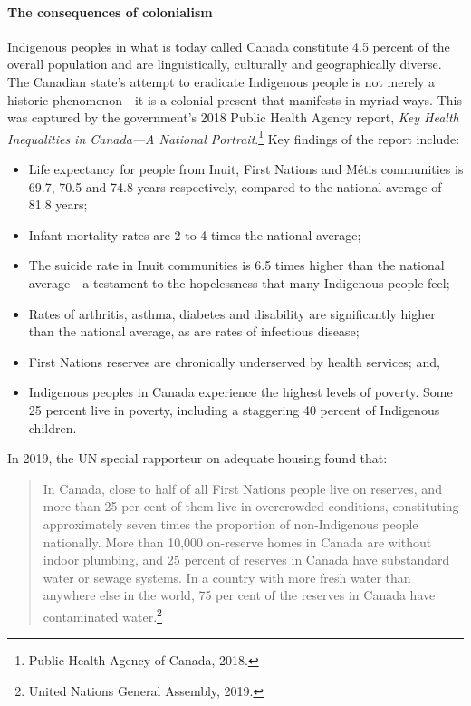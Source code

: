 \paragraph{The consequences of colonialism}

Indigenous peoples in what is today called Canada constitute 4.5 percent of the overall population and are linguistically, culturally and geographically diverse. The Canadian state's attempt to eradicate Indigenous people is not merely a historic phenomenon---it is a colonial present that manifests in myriad ways. This was captured by the government's 2018 Public Health Agency report, \emph{Key Health Inequalities in Canada---A National Portrait}.\footnote{Public Health Agency of Canada, 2018.} Key findings of the report include:

\begin{itemize}
\item Life expectancy for people from Inuit, First Nations and M\'{e}tis communities is 69.7, 70.5 and 74.8 years respectively, compared to the national average of 81.8 years;
\item Infant mortality rates are 2 to 4 times the national average;
\item The suicide rate in Inuit communities is 6.5 times higher than the national average---a testament to the hopelessness that many Indigenous people feel;
\item Rates of arthritis, asthma, diabetes and disability are significantly higher than the national average, as are rates of infectious disease;
\item First Nations reserves are chronically underserved by health services; and,
\item Indigenous peoples in Canada experience the highest levels of poverty. Some 25 percent live in poverty, including a staggering 40 percent of Indigenous children.
\end{itemize}

In 2019, the UN special rapporteur on adequate housing found that:

\blockquote{In Canada, close to half of all First Nations people live on reserves, and more than 25 per cent of them live in overcrowded conditions, constituting approximately seven times the proportion of non-Indigenous people nationally. More than 10,000 on-reserve homes in Canada are without indoor plumbing, and 25 percent of reserves in Canada have substandard water or sewage systems. In a country with more fresh water than anywhere else in the world, 75 per cent of the reserves in Canada have contaminated water.\footnote{United Nations General Assembly, 2019.}}

